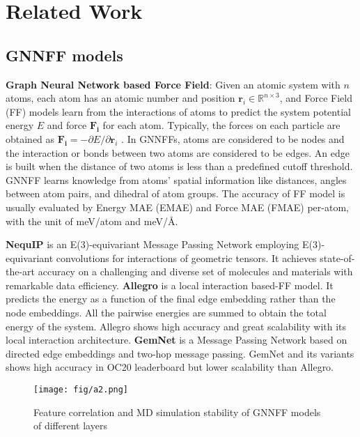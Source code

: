 \section{Related Work}
\subsection{GNNFF models}
\textbf{Graph Neural Network based Force Field}: Given an atomic system with $n$ atoms, each atom has an atomic number and position $ \bm r_i\in\mathbb{R}^{n \times 3}$, and Force Field (FF) models learn from the interactions of atoms to predict the system potential energy $E$ and force $ \bm {F_i}$ for each atom. Typically, the forces on each particle are obtained as $  \bm {F_i} = -\partial E / \partial  \bm {r}_i $ \citep{fu_forces_2022}. In GNNFFs, atoms are considered to be nodes and the interaction or bonds between two atoms are considered to be edges. An edge is built when the distance of two atoms is less than a predefined cutoff threshold. GNNFF learns knowledge from atoms' spatial information like distances, angles between atom pairs, and dihedral of atom groups. The accuracy of FF model is usually evaluated by Energy MAE (EMAE) and Force MAE (FMAE) per-atom, with the unit of meV/atom and meV/Å.

\textbf{NequIP} \citep{batzner_e3-equivariant_2022} is an E(3)-equivariant Message Passing Network employing E(3)-equivariant convolutions for interactions of geometric tensors. It achieves state-of-the-art accuracy on a challenging and diverse set of molecules and materials with remarkable data efficiency.
\textbf{Allegro} \citep{musaelian_learning_2023} is a local interaction based-FF model. It predicts the energy as a function of the final edge embedding rather than the node embeddings. All the pairwise energies are summed to obtain the total energy of the system. Allegro shows high accuracy and great scalability with its local interaction architecture.
\textbf{GemNet} \citep{gasteiger_gemnet_2021} is a Message Passing Network based on directed edge embeddings and two-hop message passing. GemNet and its variants shows high accuracy in OC20 \citep{ocp_dataset_2020} leaderboard but lower scalability than Allegro.  


\begin{figure}[t]
  \centering
  \texttt{[image: fig/a2.png]}
  \caption{Feature correlation and MD simulation stability of GNNFF models of different layers}
  \label{fig_corr}
  \vspace*{-1.0\baselineskip}
\end{figure}


